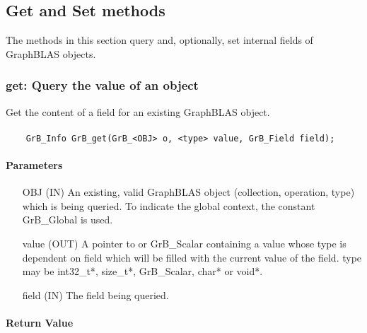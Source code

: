 \subsection{Get and Set methods}

The methods in this section query and, optionally, 
set internal fields of GraphBLAS objects.

\subsubsection{{\sf get}: Query the value of an object}

Get the content of a field for an existing GraphBLAS object.

\paragraph{\syntax}

\begin{verbatim}
    GrB_Info GrB_get(GrB_<OBJ> o, <type> value, GrB_Field field);
\end{verbatim}

\paragraph{Parameters}

\begin{itemize}[leftmargin=1.1in]
    \item[{\sf OBJ}] ({\sf IN}) An existing, valid GraphBLAS object (collection, operation, type) which is being queried.
                                To indicate the global context, the constant {\sf GrB\_Global} is used.
    \item[{\sf value}] ({\sf OUT}) A pointer to or {\sf GrB\_Scalar} containing a value whose type is dependent on {\sf field} which will be
                                 filled with the current value of the field. {\sf type} may be {\sf int32\_t*}, {\sf size\_t*},
                                 {\sf GrB\_Scalar}, {\sf char*} or {\sf void*}.
    \item[{\sf field}] ({\sf IN}) The field being queried.
\end{itemize}

\paragraph{Return Value}


